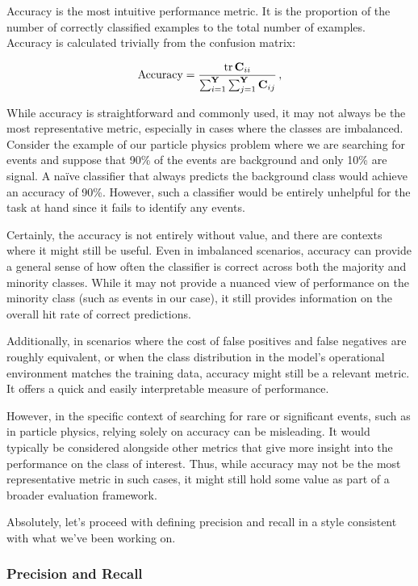 Accuracy is the most intuitive performance metric. It is the proportion of the number of correctly classified examples
to the total number of examples. Accuracy is calculated trivially from the confusion matrix:

\begin{align}
    \acc  = \frac{\trace \C_{ii}}{\sum_{i=1}^\classY \sum_{j=1}^\classY \C_{ij}}\,,
\end{align}

While accuracy is straightforward and commonly used, it may not always be the most representative metric, especially in
cases where the classes are imbalanced. Consider the example of our particle physics problem where we are searching for
\tth events and suppose that 90\% of the events are background and only 10\% are signal. A naïve classifier that
always predicts the background class would achieve an accuracy of 90\%. However, such a classifier would be entirely
unhelpful for the task at hand since it fails to identify any \tth events.

Certainly, the accuracy is not entirely without value, and there are contexts where it might still be useful. Even in
imbalanced scenarios, accuracy can provide a general sense of how often the classifier is correct across both the
majority and minority classes. While it may not provide a nuanced view of performance on the minority class (such as
\tth events in our case), it still provides information on the overall hit rate of correct predictions.

Additionally, in scenarios where the cost of false positives and false negatives are roughly equivalent, or when the
class distribution in the model's operational environment matches the training data, accuracy might still be a relevant
metric. It offers a quick and easily interpretable measure of performance.

However, in the specific context of searching for rare or significant events, such as \tth in particle physics, relying
solely on accuracy can be misleading. It would typically be considered alongside other metrics that give more insight
into the performance on the class of interest. Thus, while accuracy may not be the most representative metric in such
cases, it might still hold some value as part of a broader evaluation framework.

Absolutely, let's proceed with defining precision and recall in a style consistent with what we've been working on.

\subsubsection{Precision and Recall}

